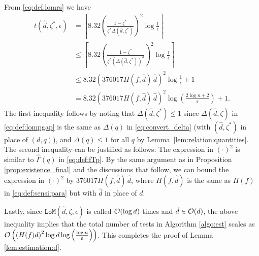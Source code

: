 \documentclass[onecolumn,letterpaper]{IEEEtran}
\newcommand{\cO}{{\cal O}}
\newcommand{\cp}{{q}}
\newcommand{\pgap}{{\Delta(\cp)}}
\newcommand{\fH}{{H(f)}}
\newcommand{\ftaup}{{\hat{\Gamma}}}
\newcommand{\fTp}{\ftaup (\cp)}
\newcommand{\lom}{{\texttt{LoM}}}
\newcommand{\lomerr}{{\epsilon}}
\newcommand{\ud}{{\hat{d}}}
\newcommand{\lomcp}{{\zeta}}
\newcommand{\lompgap}{{\Delta(\ud,\lomcp)}}
\newcommand{\esterr}{{\varepsilon}}
\newcommand{\lomcps}{{\lomcp^*}}
\newcommand{\lomrss}{{t(\ud,\lomcps,\lomerr)}}
\newcommand{\lompgaps}{{\Delta(\ud,\lomcps)}}
\begin{document}
From \eqref{eq:def:lomrs} we have
\begin{align*}
    \lomrss &= \left\lceil 8.32 \left( \frac{1-\lomcps}{\lomcps \lompgaps} \right)^2 \log \frac{1}{\lomerr}  \right\rceil\\
    &\le \left\lceil 8.32 \left( \frac{1-\lomcps}{\lomcps (\lompgaps)^2} \right)^2 \log \frac{1}{\lomerr} \right\rceil\\
    &\le 8.32 \left(376017 H(f,\ud) \, \ud\right)^2\log \frac{1}{\lomerr}+1  \\
    &= 8.32 \left(376017 H(f,\ud) \, \ud \right)^2 \log\left(\frac{2\log n+2} { \esterr }\right)+1.
\end{align*}
The first inequality follows by noting that $\lompgaps\leq 1$ since $\lompgap$ in \eqref{eq:def:lompgap} is the same as $\pgap$ in \eqref{eq:convert_delta} (with $(\ud,\lomcps)$ in place of $(d,\cp)$), and $\pgap\leq 1 $ for all $\cp$ by Lemma~\ref{lem:relation:quantities}. The second inequality can be justified as follows: The expression in $(\cdot)^2$ is similar to $\fTp$ in \eqref{eq:def:fTp}. By the same argument as in Proposition \ref{prop:existence_final} and the discussions that follow, we can bound the expression in $(\cdot)^2$ by $376017 H(f,\ud) \, \ud$, where $H(f,\ud)$ is the same as $\fH$ in \eqref{eq:def:sensi:para} but with $\ud $ in place of $d$.


Lastly, since $\lom(\ud,\lomcp,\lomerr)$ is called $\cO(\log d)$ times and $\ud\in\cO(d) $, the above inequality implies that the total number of tests in Algorithm \ref{algo:est} scales as $\cO \left(\left(\fH d\right)^2 \log d \log\left(\frac{\log n}{\esterr }\right)\right)$. This completes the proof of Lemma \ref{lem:estimation:d}.






\newpage


\end{document}
